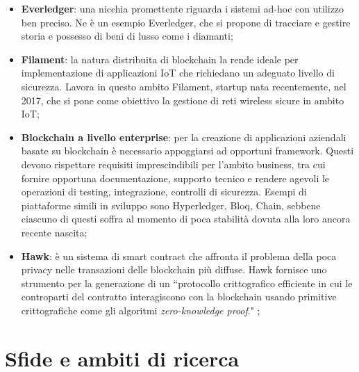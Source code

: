 \begin{itemize}
            \item \textbf{Everledger}: una nicchia promettente riguarda i sistemi ad-hoc con utilizzo ben preciso. Ne è un esempio Everledger, che si propone di tracciare e gestire storia e possesso di beni di lusso come i diamanti;

            \item \textbf{Filament}: la natura distribuita di blockchain la rende ideale per implementazione di applicazioni IoT che richiedano un adeguato livello di sicurezza. Lavora in questo ambito Filament, startup nata recentemente, nel 2017, che si pone come obiettivo la gestione di reti wireless sicure in ambito IoT;

            \item \textbf{Blockchain a livello enterprise}: per la creazione di applicazioni aziendali basate su blockchain è necessario appoggiarsi ad opportuni framework. Questi devono rispettare requisiti imprescindibili per l'ambito business, tra cui fornire opportuna documentazione, supporto tecnico e rendere agevoli le operazioni di testing, integrazione, controlli di sicurezza. Esempi di piattaforme simili in sviluppo sono Hyperledger, Bloq, Chain, sebbene ciascuno di questi soffra al momento di poca stabilità dovuta alla loro ancora recente nascita;
            
            \item \textbf{Hawk}: è un sistema di smart contract che affronta il problema della poca privacy nelle transazioni delle blockchain più diffuse. Hawk fornisce uno strumento per la generazione di un ``protocollo crittografico efficiente in cui le controparti del contratto interagiscono con la blockchain usando primitive crittografiche come gli algoritmi \emph{zero-knowledge proof}." \cite{hawk};
        \end{itemize}

\section{Sfide e ambiti di ricerca}

